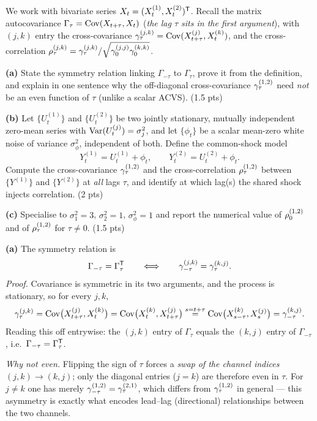 \documentclass[11pt]{article}
\begin{document}

\statementstart
We work with bivariate series $X_t=(X_t^{(1)},X_t^{(2)})^{\mathsf{T}}$. Recall the matrix
autocovariance $\Gamma_\tau=\operatorname{Cov}(X_{t+\tau},X_t)$ (\emph{the lag $\tau$ sits in
the first argument}), with $(j,k)$ entry the cross-covariance
$\gamma_\tau^{(j,k)}=\operatorname{Cov}(X_{t+\tau}^{(j)},X_t^{(k)})$, and the
cross-correlation $\rho_\tau^{(j,k)}=\gamma_\tau^{(j,k)}/\sqrt{\gamma_0^{(j,j)}\gamma_0^{(k,k)}}$.

\textbf{(a)} State the symmetry relation linking $\Gamma_{-\tau}$ to $\Gamma_\tau$, prove it from the definition, and explain in one sentence why the off-diagonal cross-covariance $\gamma_\tau^{(1,2)}$ need \emph{not} be an even function of $\tau$ (unlike a scalar ACVS). \hfill(1.5 pts)

\textbf{(b)} Let $\{U_t^{(1)}\}$ and $\{U_t^{(2)}\}$ be two jointly stationary, mutually independent zero-mean series with $\operatorname{Var}(U_t^{(j)})=\sigma_j^2$, and let $\{\phi_t\}$ be a scalar mean-zero white noise of variance $\sigma_\phi^2$, independent of both. Define the common-shock model
\[
Y_t^{(1)}=U_t^{(1)}+\phi_t,\qquad Y_t^{(2)}=U_t^{(2)}+\phi_t .
\]
Compute the cross-covariance $\gamma_\tau^{(1,2)}$ and the cross-correlation $\rho_\tau^{(1,2)}$ between $\{Y^{(1)}\}$ and $\{Y^{(2)}\}$ at \emph{all} lags $\tau$, and identify at which lag(s) the shared shock injects correlation. \hfill(2 pts)

\textbf{(c)} Specialise to $\sigma_1^2=3$, $\sigma_2^2=1$, $\sigma_\phi^2=1$ and report the numerical value of $\rho_0^{(1,2)}$ and of $\rho_\tau^{(1,2)}$ for $\tau\neq0$. \hfill(1.5 pts)
\statementend

\textbf{(a)} The symmetry relation is
\[
\Gamma_{-\tau}=\Gamma_\tau^{\mathsf{T}}
\qquad\Longleftrightarrow\qquad
\gamma_{-\tau}^{(j,k)}=\gamma_\tau^{(k,j)} .
\]
\emph{Proof.} Covariance is symmetric in its two arguments, and the process is stationary, so for every $j,k$,
\[
\gamma_\tau^{(j,k)}=\operatorname{Cov}\bigl(X_{t+\tau}^{(j)},X_t^{(k)}\bigr)
=\operatorname{Cov}\bigl(X_t^{(k)},X_{t+\tau}^{(j)}\bigr)
\overset{s=t+\tau}{=}\operatorname{Cov}\bigl(X_{s-\tau}^{(k)},X_s^{(j)}\bigr)
=\gamma_{-\tau}^{(k,j)} .
\]
Reading this off entrywise: the $(j,k)$ entry of $\Gamma_\tau$ equals the $(k,j)$ entry of $\Gamma_{-\tau}$, i.e.\ $\Gamma_{-\tau}=\Gamma_\tau^{\mathsf{T}}$.

\emph{Why not even.} Flipping the sign of $\tau$ forces a \emph{swap of the channel indices} $(j,k)\to(k,j)$; only the diagonal entries ($j=k$) are therefore even in $\tau$. For $j\neq k$ one has merely $\gamma_{-\tau}^{(1,2)}=\gamma_\tau^{(2,1)}$, which differs from $\gamma_\tau^{(1,2)}$ in general --- this asymmetry is exactly what encodes lead--lag (directional) relationships between the two channels.
\end{document}
